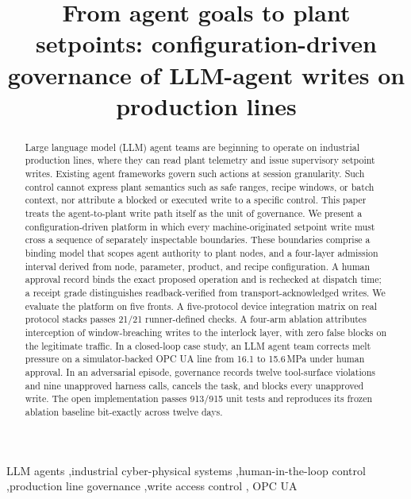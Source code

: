 \documentclass[review,12pt,a4paper]{elsarticle}
\begin{document}
\begin{frontmatter}

\title{From agent goals to plant setpoints: configuration-driven governance
of LLM-agent writes on production lines}


\begin{abstract}
Large language model (LLM) agent teams are beginning to operate on industrial
production lines, where they can read plant telemetry and issue supervisory
setpoint writes. Existing agent frameworks govern such actions at session
granularity. Such control cannot express plant semantics such as safe ranges,
recipe windows, or batch context, nor attribute a blocked or executed write
to a specific control. This paper treats the agent-to-plant write path itself
as the unit of governance. We present a configuration-driven platform in
which every machine-originated setpoint write must cross a sequence of
separately inspectable boundaries. These boundaries comprise a binding model
that scopes agent authority to plant nodes, and a four-layer admission
interval derived from node, parameter, product, and recipe configuration. A
human approval record binds the exact proposed operation and is rechecked at
dispatch time; a receipt grade distinguishes readback-verified from
transport-acknowledged writes. We evaluate the platform on five fronts. A
five-protocol device integration matrix on real protocol stacks passes 21/21
runner-defined checks. A four-arm ablation attributes interception of
window-breaching writes to the interlock layer, with zero false blocks on
the legitimate traffic. In a closed-loop case study, an LLM agent team
corrects melt pressure on a simulator-backed OPC UA line from 16.1 to
15.6\,MPa under human approval. In an adversarial episode, governance records twelve tool-surface
violations and nine unapproved harness calls, cancels the task, and blocks
every unapproved write. The open implementation passes 913/915 unit tests
and reproduces its frozen ablation baseline bit-exactly across twelve days.
\end{abstract}

\begin{keyword}
LLM agents \sep industrial cyber-physical systems \sep human-in-the-loop
control \sep production line governance \sep write access control \sep
OPC UA
\end{keyword}

\end{frontmatter}
\end{document}
